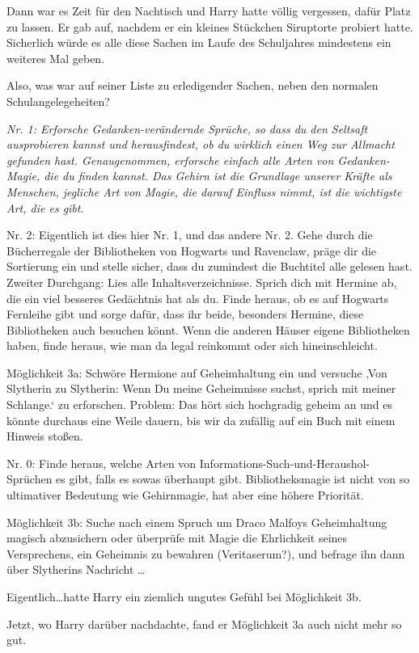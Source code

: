 {Dann war es Zeit für den Nachtisch und Harry hatte völlig vergessen, dafür Platz zu lassen. Er gab auf, nachdem er ein kleines Stückchen Siruptorte probiert hatte. Sicherlich würde es alle diese Sachen im Laufe des Schuljahres mindestens ein weiteres Mal geben.

Also, was war auf seiner Liste zu erledigender Sachen, neben den normalen Schulangelegeheiten?

\emph{Nr. 1: Erforsche Gedanken-verändernde Sprüche, so dass du den Seltsaft ausprobieren kannst und herausfindest, ob du wirklich einen Weg zur Allmacht gefunden hast. Genaugenommen, erforsche einfach alle Arten von Gedanken-Magie, die du finden kannst. Das Gehirn ist die Grundlage unserer Kräfte als Menschen, jegliche Art von Magie, die darauf Einfluss nimmt, ist die wichtigste Art, die es gibt.}

Nr. 2: Eigentlich ist dies hier Nr. 1, und das andere Nr. 2. Gehe durch die Bücherregale der Bibliotheken von Hogwarts und Ravenclaw, präge dir die Sortierung ein und stelle sicher, dass du zumindest die Buchtitel alle gelesen hast. Zweiter Durchgang: Lies alle Inhaltsverzeichnisse. Sprich dich mit Hermine ab, die ein viel besseres Gedächtnis hat als du. Finde heraus, ob es auf Hogwarts Fernleihe gibt und sorge dafür, dass ihr beide, besonders Hermine, diese Bibliotheken auch besuchen könnt. Wenn die anderen Häuser eigene Bibliotheken haben, finde heraus, wie man da legal reinkommt oder sich hineinschleicht.

Möglichkeit 3a: Schwöre Hermione auf Geheimhaltung ein und versuche ‚Von Slytherin zu Slytherin: Wenn Du meine Geheimnisse suchst, sprich mit meiner Schlange.` zu erforschen. Problem: Das hört sich hochgradig geheim an und es könnte durchaus eine Weile dauern, bis wir da zufällig auf ein Buch mit einem Hinweis stoßen.

Nr. 0: Finde heraus, welche Arten von Informations-Such-und-Heraushol-Sprüchen es gibt, falls es sowas überhaupt gibt. Bibliotheksmagie ist nicht von so ultimativer Bedeutung wie Gehirnmagie, hat aber eine höhere Priorität.

Möglichkeit 3b: Suche nach einem Spruch um Draco Malfoys Geheimhaltung magisch abzusichern oder überprüfe mit Magie die Ehrlichkeit seines Versprechens, ein Geheimnis zu bewahren (Veritaserum?), und befrage ihn dann über Slytherins Nachricht …

Eigentlich…hatte Harry ein ziemlich ungutes Gefühl bei Möglichkeit 3b.

Jetzt, wo Harry darüber nachdachte, fand er Möglichkeit 3a auch nicht mehr so gut.

}
